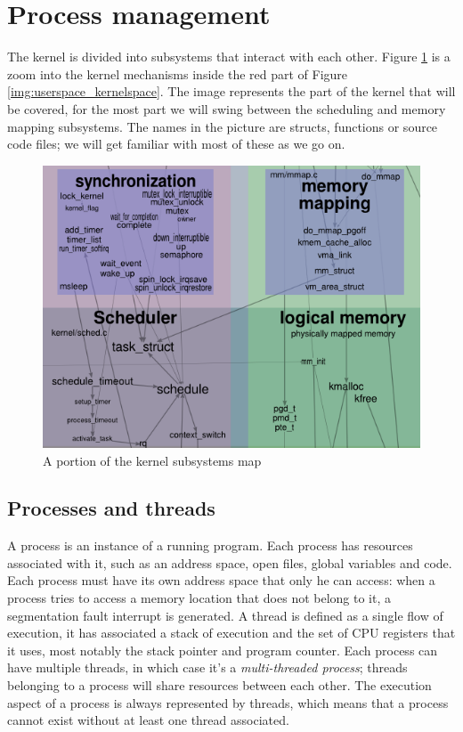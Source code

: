 \documentclass[10pt, oneside]{book}
\begin{document}
\section{Process management}
The kernel is divided into subsystems that interact with each other. Figure \ref{img:kernelmap} is a zoom into the kernel mechanisms inside the red part of Figure \ref{img:userspace_kernelspace}. The image represents the part of the kernel that will be covered, for the most part we will swing between the scheduling and memory mapping subsystems. The names in the picture are structs, functions or source code files; we will get familiar with most of these as we go on.

\begin{figure}[ht]
\includegraphics[width=\textwidth]{images/kernelmap.png}
\caption{A portion of the kernel subsystems map}
\label{img:kernelmap}
\end{figure}

\subsection{Processes and threads}
\label{sec:proc_threads}
A process is an instance of a running program. Each process has resources associated with it, such as an address space, open files, global variables and code. Each process must have its own address space that only he can access: when a process tries to access a memory location that does not belong to it, a segmentation fault interrupt is generated. A thread is defined as a single flow of execution, it has associated a stack of execution and the set of CPU registers that it uses, most notably the stack pointer and program counter. Each process can have multiple threads, in which case it's a \textit{multi-threaded process}; threads belonging to a process will share resources between each other. The execution aspect of a process is always represented by threads, which means that a process cannot exist without at least one thread associated.
\end{document}
